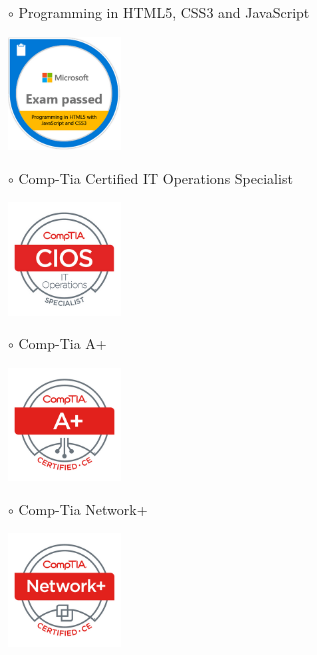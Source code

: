 \documentclass[10pt,a4paper,ragged2e,withhyper]{altacv}
\begin{document}
    \newpage
    \thispagestyle{empty}
    \begin{adjustbox}{valign=t}
    \begin{minipage}{0.3\textwidth}
        \textcolor{ColorOne}{$\circ$} Programming in HTML5, CSS3 and JavaScript\\
            \begin{center}
            {\includegraphics[width=3cm]{Assets/Cert Badges/Microsoft_Programming_in_HTML5_with_JavaScript.png}}\\
            \end{center}
            \textcolor{ColorOne}{$\circ$} Comp-Tia Certified IT Operations Specialist \\
            \begin{center}
            {\includegraphics[width=3cm]{Assets/Cert Badges/CompTIA_CIOS.png}}\\
            \end{center}
            \textcolor{ColorOne}{$\circ$} Comp-Tia A+\\
            \begin{center}
            {\includegraphics[width=3cm]{Assets/Cert Badges/CompTIA_A+.png}}\\
            \end{center}
            \textcolor{ColorOne}{$\circ$} Comp-Tia Network+\\
            \begin{center}
            {\includegraphics[width=3cm]{Assets/Cert Badges/CompTIA_Network+.png}}\\
            \end{center}
            

\end{minipage}
\end{adjustbox}
\end{document}
